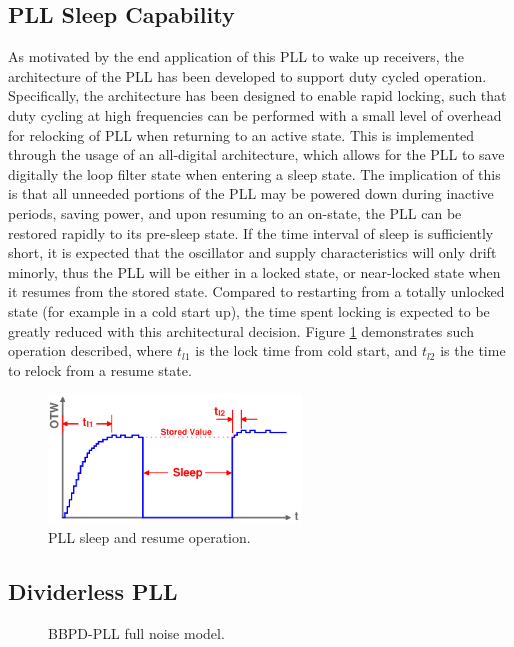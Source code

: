 	\subsection{PLL Sleep Capability}
	As motivated by the end application of this PLL to wake up receivers, the architecture of the PLL has been developed to support duty cycled operation. Specifically, the architecture has been designed to enable rapid locking, such that duty cycling at high frequencies can be performed with a small level of overhead for relocking of PLL when returning to an active state. This is implemented through the usage of an all-digital architecture, which allows for the PLL to save digitally the loop filter state when entering a sleep state. The implication of this is that all unneeded portions of the PLL may be powered down during inactive periods, saving power, and upon resuming to an on-state, the PLL can be restored rapidly to its pre-sleep state. If the time interval of sleep is sufficiently short, it is expected that the oscillator and supply characteristics will only drift minorly, thus the PLL will be either in a locked state, or near-locked state when it resumes from the stored state. Compared to restarting from a totally unlocked state (for example in a cold start up), the time spent locking is expected to be greatly reduced with this architectural decision. Figure \ref{fig:pll_sleep} demonstrates such operation described, where $t_{l1}$ is the lock time from cold start, and $t_{l2}$ is the time to relock from a resume state.

			\begin{figure}[htb!]
			        \centering
			        \includegraphics[width=0.6\textwidth, angle=0]{./figs/design/pll_sleep}
			    \caption{PLL sleep and resume operation.}
			    \label{fig:pll_sleep}
			\end{figure}


	\subsection{Dividerless PLL}

	\begin{figure}[htb!]
		\center
		\caption{BBPD-PLL full noise model.}
		\label{fig:bbpll_full_noise}
	\end{figure}

